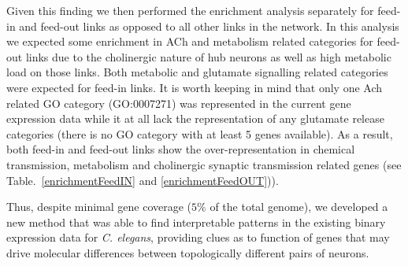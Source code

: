 \documentclass[10pt,letterpaper]{article}
\newlength\savedwidth
\newcommand\thickhline{\noalign{\global\savedwidth\arrayrulewidth\global\arrayrulewidth 2pt}%
\hline
\noalign{\global\arrayrulewidth\savedwidth}}
\begin{document}
Given this finding we then performed the enrichment analysis separately for feed-in and feed-out links as opposed to all other links in the network. 
In this analysis we expected some enrichment in ACh and metabolism related categories for feed-out links due to the cholinergic nature of hub neurons as well as high metabolic load on those links. 
Both metabolic and glutamate signalling related categories were expected for feed-in links. 
It is worth keeping in mind that only one Ach related GO category (GO:0007271) was represented in the current gene expression data while it at all lack the representation of any glutamate release categories (there is no GO category with at least 5 genes available). 
As a result, both feed-in and feed-out links show the over-representation in chemical transmission, metabolism and cholinergic synaptic transmission related genes (see Table.~\ref{enrichmentFeedIN} and \ref{enrichmentFeedOUT})).  

Thus, despite minimal gene coverage ($5\%$ of the total genome), we developed a new method that was able to find interpretable patterns in the existing binary expression data for \emph{C. elegans}, providing clues as to function of genes that may drive molecular differences between topologically different pairs of neurons.


\end{document}
